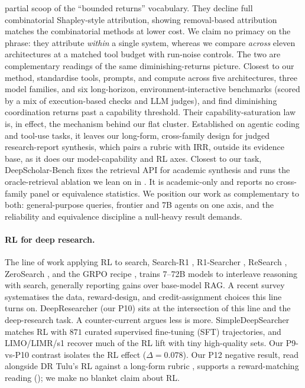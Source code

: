 \documentclass[11pt]{article}
\begin{document}
partial scoop of the ``bounded returns'' vocabulary. They decline full combinatorial
Shapley-style attribution, showing removal-based attribution matches the combinatorial
methods at lower cost. We claim no primacy on
the phrase: they attribute \emph{within} a single system, whereas we compare
\emph{across} eleven architectures at a matched tool budget with run-noise controls.
The two are complementary readings of the same diminishing-returns picture. Closest to our method, \citet{scaling_agents2025}
standardise tools, prompts, and compute across five architectures, three model
families, and six long-horizon, environment-interactive benchmarks (scored by a mix of
execution-based checks and LLM judges), and find diminishing coordination returns past
a capability threshold. Their capability-saturation law is, in effect, the mechanism
behind our flat cluster. Established on agentic coding and tool-use tasks, it leaves our
long-form, cross-family design for judged research-report
synthesis, which pairs a rubric with IRR, outside its evidence base, as it does our model-capability and RL axes.
Closest to our task,
DeepScholar-Bench \citep{deepscholarbench2025} fixes the retrieval API for academic
synthesis and runs the oracle-retrieval ablation we lean on in . It is
academic-only and reports no cross-family panel or equivalence statistics. We position
our work as complementary to both: general-purpose queries, frontier and 7B agents on
one axis, and the reliability and equivalence discipline a null-heavy result demands.

\paragraph{RL for deep research.} The line of work applying RL to search, Search-R1
\citep{searchr1_2025}, R1-Searcher \citep{r1searcher2025}, ReSearch
\citep{chen2025research}, ZeroSearch \citep{zerosearch2025}, and the GRPO recipe
\citep{shao2024deepseekmath,deepseek_r12025}, trains 7--72B models to interleave
reasoning with search, generally reporting gains over base-model RAG. A recent survey
\citep{rl_foundations_dr_survey2025} systematises the data, reward-design, and
credit-assignment choices this line turns on. DeepResearcher (our P10) sits at the
intersection of this line and the deep-research task. A counter-current argues less is
more. SimpleDeepSearcher \citep{sun2025simpledeepsearcher} matches RL with $871$
curated supervised fine-tuning (SFT) trajectories, and LIMO/LIMR/s1
\citep{ye2025limo,li2025limr,muennighoff2025s1} recover much of the RL lift with tiny
high-quality sets. Our P9-vs-P10 contrast isolates the RL effect ($\Delta=0.078$). Our
P12 negative result, read alongside DR Tulu's RL against a long-form rubric
\citep{shao2025drtulu}, supports a reward-matching reading ();
we make no blanket claim about RL.
\end{document}
